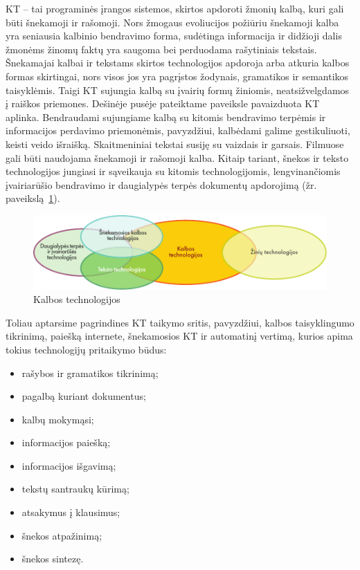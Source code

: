 
\begin{multicols}{2}

KT – tai programinės įrangos sistemos, skirtos apdoroti žmonių kalbą, kuri gali būti šnekamoji ir rašomoji. Nors žmogaus evoliucijos požiūriu šnekamoji kalba yra seniausia kalbinio bendravimo forma, sudėtinga informacija ir didžioji dalis žmonėms žinomų faktų yra saugoma bei perduodama rašytiniais tekstais. Šnekamajai kalbai ir tekstams skirtos technologijos apdoroja arba atkuria kalbos formas skirtingai, nors visos jos yra pagrįstos žodynais, gramatikos ir semantikos taisyklėmis. Taigi KT sujungia kalbą su įvairių formų žiniomis, neatsižvelgdamos į raiškos priemones. Dešinėje pusėje pateiktame paveiksle pavaizduota KT aplinka. Bendraudami sujungiame kalbą su kitomis bendravimo terpėmis ir informacijos perdavimo priemonėmis, pavyzdžiui, kalbėdami galime gestikuliuoti, keisti veido išraišką. Skaitmeniniai tekstai susiję su  vaizdais ir garsais. Filmuose gali būti naudojama šnekamoji ir rašomoji kalba. Kitaip tariant, šnekos ir teksto technologijos jungiasi ir sąveikauja su kitomis technologijomis, lengvinančiomis įvairiarūšio bendravimo ir daugialypės terpės dokumentų apdorojimą (žr. paveikslą~\ref{fig:ltincontext_de}).

\begin{figure}[htb]
  \center
  \includegraphics[width=\textwidth]{../_media/lithuanian/language_technologies}
  \caption{Kalbos technologijos}
  \label{fig:ltincontext_de}
\end{figure}

Toliau aptarsime pagrindines KT taikymo sritis, pavyzdžiui, kalbos taisyklingumo tikrinimą, paiešką internete, šnekamosios KT ir automatinį vertimą, kurios apima tokius technologijų pritaikymo būdus:

\begin{itemize}
\item  rašybos ir gramatikos tikrinimą;
\item pagalbą kuriant dokumentus;
\item kalbų mokymąsi;
\item  informacijos paiešką;
\item  informacijos išgavimą;
\item tekstų santraukų kūrimą;
\item atsakymus į klausimus;
\item šnekos atpažinimą; 
\item  šnekos sintezę.
\end{itemize}


\end{multicols}
